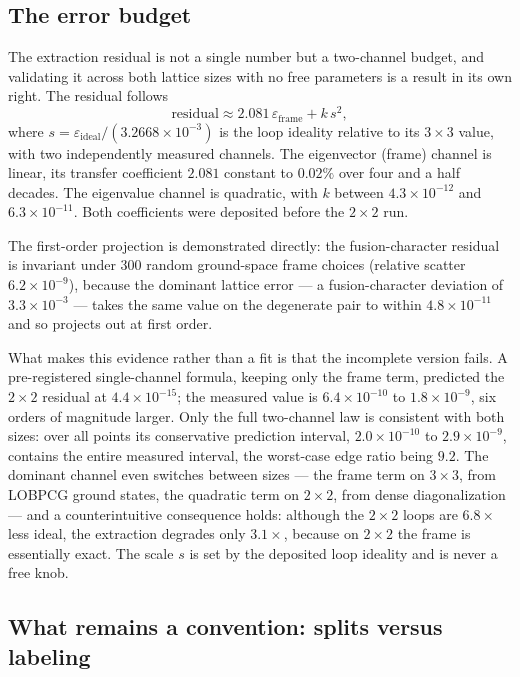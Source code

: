 \documentclass[aps,pra,twocolumn,superscriptaddress,longbibliography,floatfix,nofootinbib]{revtex4-2}
\begin{document}
\subsection{The error budget}
\label{sec:errorbudget}

The extraction residual is not a single number but a two-channel budget, and
validating it across both lattice sizes with no free parameters is a result in
its own right. The residual follows
\begin{equation}
  \text{residual} \approx 2.081\,\varepsilon_{\mathrm{frame}} + k\,s^{2},
  \label{eq:budget}
\end{equation}
where $s=\varepsilon_{\mathrm{ideal}}/(3.2668\times10^{-3})$ is the loop
ideality relative to its $3\times3$ value, with two independently measured
channels. The eigenvector (frame) channel is
linear, its transfer coefficient $2.081$ constant to $0.02\%$ over four and a
half decades. The eigenvalue channel is quadratic, with $k$ between
$4.3\times10^{-12}$ and $6.3\times10^{-11}$. Both coefficients were deposited
before the $2\times2$ run.

The first-order projection is demonstrated directly: the fusion-character
residual is invariant under $300$ random ground-space frame choices (relative
scatter $6.2\times10^{-9}$), because the dominant lattice error --- a
fusion-character deviation of $3.3\times10^{-3}$ --- takes the same value on the
degenerate pair to within $4.8\times10^{-11}$ and so projects out at first
order.

What makes this evidence rather than a fit is that the incomplete version
fails. A pre-registered single-channel formula, keeping only the frame term,
predicted the $2\times2$ residual at $4.4\times10^{-15}$; the measured value is
$6.4\times10^{-10}$ to $1.8\times10^{-9}$, six orders of magnitude larger. Only
the full two-channel law is consistent with both sizes: over all points its
conservative prediction interval, $2.0\times10^{-10}$ to $2.9\times10^{-9}$,
contains the entire measured interval, the worst-case edge ratio being $9.2$.
The dominant channel even switches between sizes --- the frame term on
$3\times3$, from LOBPCG ground states, the quadratic term on $2\times2$, from
dense diagonalization --- and a counterintuitive consequence holds: although
the $2\times2$ loops are $6.8\times$ less ideal, the extraction degrades only
$3.1\times$, because on $2\times2$ the frame is essentially exact. The scale $s$
is set by the deposited loop ideality and is never a free knob.

\subsection{What remains a convention: splits versus labeling}
\label{sec:splits}
\end{document}
